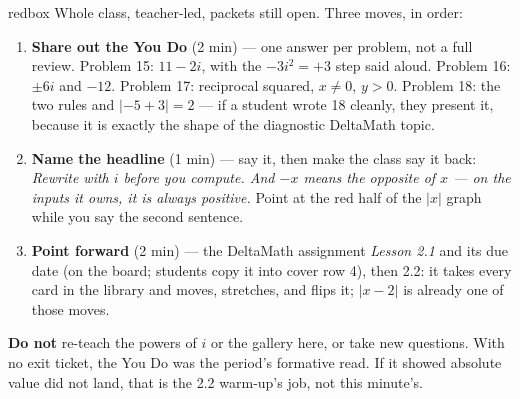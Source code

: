 \documentclass[10pt]{article}
\begin{document}
\boxguard[20]
\begin{skillbox}{redbox}
Whole class, teacher-led, packets still open. Three moves, in order:
\begin{enumerate}[itemsep=3pt]
  \item \textbf{Share out the You Do} (2 min) --- one answer per problem, not a full review.
        Problem 15: $11 - 2i$, with the $-3i^2 = +3$ step said aloud. Problem 16: $\pm 6i$ and
        $-12$. Problem 17: reciprocal squared, $x \ne 0$, $y > 0$. Problem 18: the two rules
        and $|-5 + 3| = 2$ --- if a student wrote 18 cleanly, they present it, because it is
        exactly the shape of the diagnostic DeltaMath topic.
  \item \textbf{Name the headline} (1 min) --- say it, then make the class say it back:
        \textit{Rewrite with $i$ before you compute. And $-x$ means the opposite of $x$ --- on
        the inputs it owns, it is always positive.} Point at the red half of the $|x|$ graph
        while you say the second sentence.
  \item \textbf{Point forward} (2 min) --- the DeltaMath assignment \textit{Lesson 2.1} and its
        due date (on the board; students copy it into cover row 4), then 2.2: it takes every
        card in the library and moves, stretches, and flips it; $|x - 2|$ is already one of
        those moves.
\end{enumerate}
\textbf{Do not} re-teach the powers of $i$ or the gallery here, or take new questions. With no
exit ticket, the You Do was the period's formative read. If it showed
absolute value did not land, that is the 2.2 warm-up's job, not this minute's.
\end{skillbox}
\end{document}
